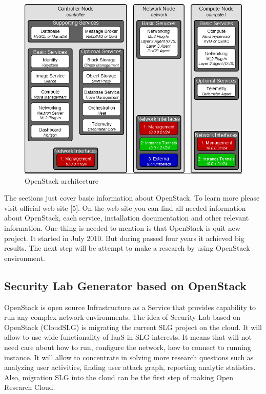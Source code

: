 \begin{figure}[ht!]
\centering
\includegraphics[width=\textwidth]{openstack_architecture.png}
\caption{OpenStack architecture}
\label{overflow}
\end{figure}

The sections just cover basic information about OpenStack. To learn more please visit official web site [5]. On the web site you can find all needed information about OpenStack, each service, installation documentation and other relevant information. One thing is needed to mention is that OpenStack is quit new project. It started in July 2010. But during passed four years it achieved big results. The next step will be attempt to make a research by using OpenStack environment. 


\subsection{Security Lab Generator based on OpenStack}
OpenStack is open source Infrastructure as a Service that provides capability to run any complex network environments. The idea of Security Lab based on OpenStack (CloudSLG) is migrating the current SLG project on the cloud. It will allow to use wide functionality of IaaS in SLG interests. It means that will not need care about how to run, configure the network, how to connect to running instance. It will allow to concentrate in solving more research questions such as analyzing user activities, finding user attack graph, reporting analytic statistics. Also, migration SLG into the cloud can be the first step of making Open Research Cloud.    





% 